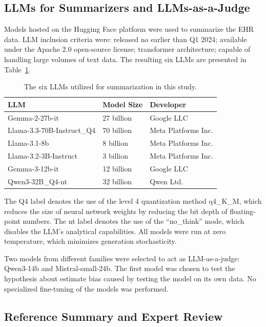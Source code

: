 \documentclass[runningheads]{llncs}
\begin{document}
\subsection{LLMs for Summarizers and LLMs-as-a-Judge}\label{subsec:llms}

Models hosted on the Hugging Face platform were used to summarize the EHR data. LLM inclusion criteria were: released no earlier than Q1 2024; available under the Apache 2.0 open-source license; transformer architecture; capable of handling large volumes of text data. The resulting six LLMs are presented in Table~\ref{tab:llms}.

\begin{table}[t]
\caption{The six LLMs utilized for summarization in this study.}\label{tab:llms}
\centering
\begin{tabular}{@{}lll@{}}
\toprule
\textbf{LLM} & \textbf{Model Size} & \textbf{Developer} \\
\midrule
Gemma-2-27b-it & 27 billion & Google LLC \\
Llama-3.3-70B-Instruct\_Q4 & 70 billion & Meta Platforms Inc. \\
Llama-3.1-8b & 8 billion & Meta Platforms Inc. \\
Llama-3.2-3B-Instruct & 3 billion & Meta Platforms Inc. \\
Gemma-3-12b-it & 12 billion & Google LLC \\
Qwen3-32B\_Q4-nt & 32 billion & Qwen Ltd. \\
\bottomrule
\end{tabular}
\end{table}

The Q4 label denotes the use of the level 4 quantization method q4\_K\_M, which reduces the size of neural network weights by reducing the bit depth of floating-point numbers. The nt label denotes the use of the ``no\_think'' mode, which disables the LLM's analytical capabilities. All models were run at zero temperature, which minimizes generation stochasticity.

Two models from different families were selected to act as LLM-as-a-judge: Qwen3-14b and Mistral-small-24b. The first model was chosen to test the hypothesis about estimate bias caused by testing the model on its own data. No specialized fine-tuning of the models was performed.

\subsection{Reference Summary and Expert Review}\label{subsec:expert}
\end{document}
